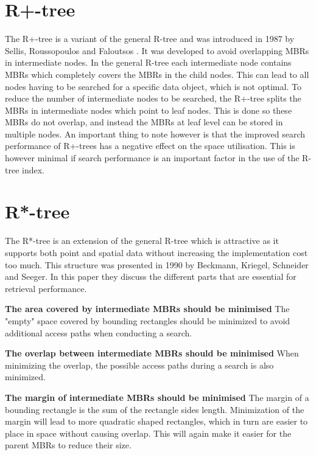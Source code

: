 \section{R+-tree}
The R+-tree is a variant of the general R-tree and was introduced in 1987 by Sellis, Roussopoulos and Faloutsos \cite{R+Tree}. It was developed to avoid overlapping MBRs in intermediate nodes. In the general R-tree each intermediate node contains MBRs which completely covers the MBRs in the child nodes. This can lead to all nodes having to be searched for a specific data object, which is not optimal. To reduce the number of intermediate nodes to be searched, the R+-tree splits the MBRs in intermediate nodes which point to leaf nodes. This is done so these MBRs do not overlap, and instead the MBRs at leaf level can be stored in multiple nodes. An important thing to note however is that the improved search performance of R+-trees has a negative effect on the space utilisation. This is however minimal if search performance is an important factor in the use of the R-tree index. 

\section{R*-tree}
The R*-tree is an extension of the general R-tree which is attractive as it supports both point and spatial data without increasing the implementation cost too much. This structure was presented in 1990 by Beckmann, Kriegel, Schneider and Seeger\cite{R*-tree}. In this paper they discuss the different parts that are essential for retrieval performance.\newline

\textbf{The area covered by intermediate MBRs should be minimised}\newline
The "empty" space covered by bounding rectangles should be minimized to avoid additional access paths when conducting a search. \newline

\textbf{The overlap between intermediate MBRs should be minimised}\newline
When minimizing the overlap, the possible access paths during a search is also minimized. \newline

\textbf{The margin of intermediate MBRs should be minimised}\newline
The margin of a bounding rectangle is the sum of the rectangle sides length. Minimization of the margin will lead to more quadratic shaped rectangles, which in turn are easier to place in space without causing overlap. This will again make it easier for the parent MBRs to reduce their size. \newline

